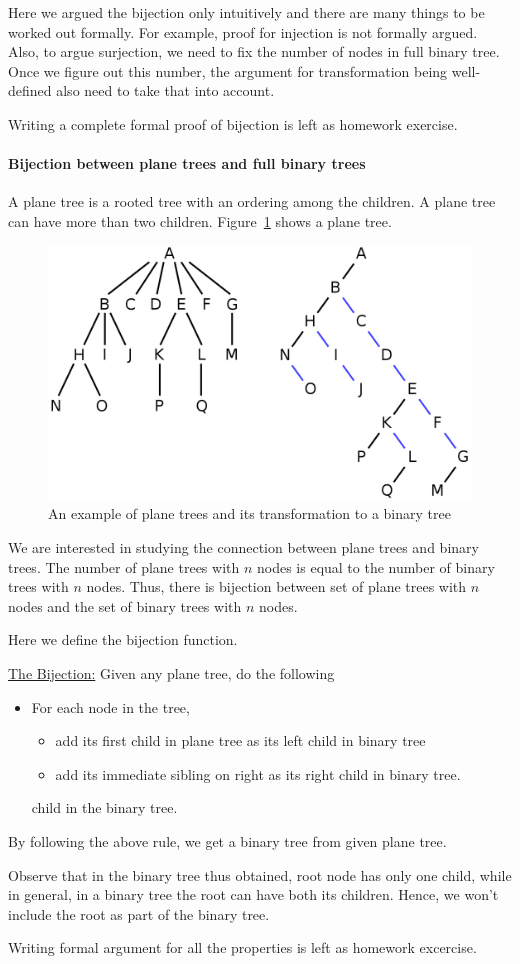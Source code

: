 Here we argued the bijection only intuitively and there are many things to be worked out formally. For example, proof for injection is not formally argued. Also, to argue surjection, we need to fix the number of nodes in full binary tree. Once we figure out this number, the argument for transformation being  well-defined also need to take that into account.

Writing a complete formal proof of bijection is left as homework exercise.

\paragraph{Bijection between plane trees and full binary trees}
A plane tree is a rooted tree with an ordering among the children. A plane tree can have more than two children. Figure~\ref{fig:plane-tree-1} shows a plane tree. 

\begin{figure}[h!]
    \centering
    \includegraphics[width=0.8\linewidth]{images/plane-tree.png}
    \caption{An example of plane trees and its transformation to a binary tree}
    \label{fig:plane-tree-1}
\end{figure}

We are interested in studying the connection between plane trees and binary trees. The number of plane trees with $n$ nodes is equal to the number of binary trees with $n$ nodes. Thus, there is bijection between set of plane trees with $n$ nodes and the set of  binary trees with $n$ nodes. 

Here we define the bijection function. 

\noindent\underline{The Bijection:} Given any plane tree, do the following
\begin{itemize}
    \item For each node in the tree, 
    \begin{itemize}
        \item add its first child in plane tree as its left child in binary tree
        \item add its immediate sibling on right as its right child in binary tree.
    \end{itemize} child in the binary tree.
\end{itemize}
By following the above rule, we get a binary tree from given plane tree.

Observe that in the binary tree thus obtained, root node has only one child, while in general, in a binary tree the root can have both its children. Hence, we won't include the root as part of the binary tree.

Writing formal argument for all the properties is left as homework excercise.
